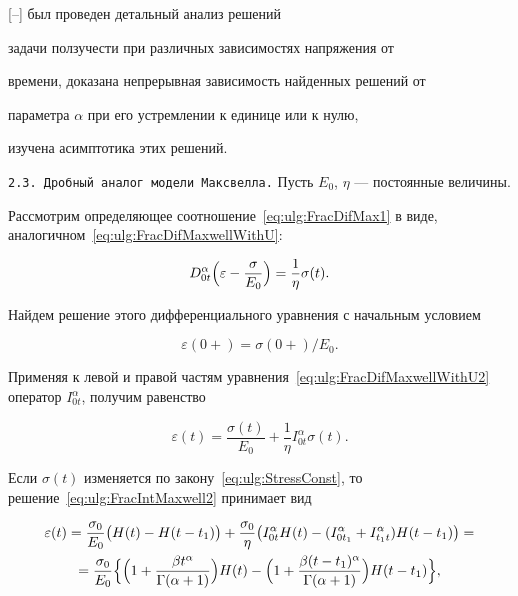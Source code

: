 [--] был проведен детальный анализ решений

задачи ползучести при различных зависимостях напряжения от

времени, доказана непрерывная зависимость найденных решений от

параметра $\alpha$ при его устремлении к единице или к нулю,

изучена асимптотика этих решений.



\smallskip



\texttt{2.3. Дробный аналог модели Максвелла.} Пусть $E_{0}$, $\eta$ --- постоянные \linebreak величины.

Рассмотрим определяющее соотношение~\eqref{eq:ulg:FracDifMax1} в виде, аналогичном~\eqref{eq:ulg:FracDifMaxwellWithU}:

\begin{equation}\label{eq:ulg:FracDifMaxwellWithU2}

D_{0t}^{\alpha}

\Bigl(\varepsilon-\frac{\sigma}{E_{0}}\Bigr)=\frac{1}{\eta}\sigma(t).

\end{equation}

Найдем решение этого дифференциального уравнения с начальным условием 

$$\varepsilon(0+)=\sigma(0+)/E_{0}.$$ 

Применяя к левой и правой частям уравнения~\eqref{eq:ulg:FracDifMaxwellWithU2} оператор $I_{0t}^{\alpha}$, получим равенство

\begin{equation}\label{eq:ulg:FracIntMaxwell2}

\varepsilon(t)=\frac{\sigma(t)}{E_{0}}+\frac{1}{\eta}I_{0t}^{\alpha}\sigma(t).

\end{equation}

Если $\sigma(t)$ изменяется по закону~\eqref{eq:ulg:StressConst}, то решение~\eqref{eq:ulg:FracIntMaxwell2} принимает вид

\begin{multline}\label{eq:ulg:FracMaxwellSolution}

\varepsilon(t)=\frac{\sigma_{0}}{E_{0}} \bigl( H(t)-H(t-t_{1})\bigr)+\frac{\sigma_{0}}{\eta} \bigl(I_{0t}^{\alpha}H(t)-(I_{0t_{1}}^{\alpha}+I_{t_{1}t}^{\alpha})H(t-t_{1})\bigr)=\\

=\frac{\sigma_{0}}{E_{0}}

\Bigl\{\Bigl(1+\frac{\beta t^{\alpha}}{ \Gamma (\alpha+1)}\Bigr)H(t)-\Bigl(1+\frac{\beta(

t-t_{1})^{\alpha}}{ \Gamma (\alpha+1)}\Bigr)H(t-t_{1})\Bigr\},

\end{multline}

